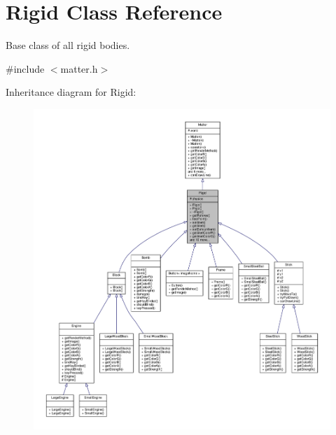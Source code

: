 \hypertarget{classRigid}{}\section{Rigid Class Reference}
\label{classRigid}


Base class of all rigid bodies.  




{\ttfamily \#include $<$matter.\+h$>$}



Inheritance diagram for Rigid\+:\nopagebreak
\begin{figure}[H]
\begin{center}
\leavevmode
\includegraphics[width=350pt]{classRigid__inherit__graph}
\end{center}
\end{figure}


